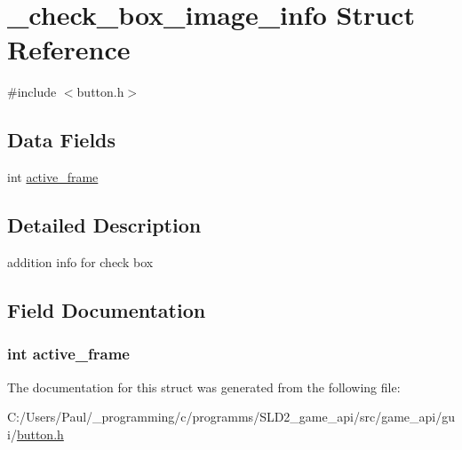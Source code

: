 \hypertarget{struct__check__box__image__info}{\section{\+\_\+check\+\_\+box\+\_\+image\+\_\+info Struct Reference}
\label{struct__check__box__image__info}
}


{\ttfamily \#include $<$button.\+h$>$}

\subsection*{Data Fields}
\begin{DoxyCompactItemize}
\item 
int \hyperlink{struct__check__box__image__info_ab9f5f69e3cdf7b73b9e13348e0755ff3}{active\+\_\+frame}
\end{DoxyCompactItemize}


\subsection{Detailed Description}
addition info for check box 

\subsection{Field Documentation}
\hypertarget{struct__check__box__image__info_ab9f5f69e3cdf7b73b9e13348e0755ff3}{
\subsubsection[{active\+\_\+frame}]{\setlength{\rightskip}{0pt plus 5cm}int active\+\_\+frame}}\label{struct__check__box__image__info_ab9f5f69e3cdf7b73b9e13348e0755ff3}


The documentation for this struct was generated from the following file\+:\begin{DoxyCompactItemize}
\item 
C\+:/\+Users/\+Paul/\+\_\+programming/c/programms/\+S\+L\+D2\+\_\+game\+\_\+api/src/game\+\_\+api/gui/\hyperlink{button_8h}{button.\+h}\end{DoxyCompactItemize}
